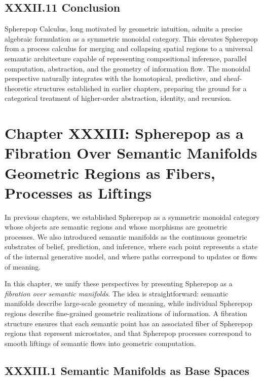\documentclass[12pt,letterpaper]{article}
\begin{document}
\subsection{XXXII.11 Conclusion}

Spherepop Calculus, long motivated by geometric intuition, admits a precise algebraic formulation as a symmetric monoidal category. This elevates Spherepop from a process calculus for merging and collapsing spatial regions to a universal semantic architecture capable of representing compositional inference, parallel computation, abstraction, and the geometry of information flow. The monoidal perspective naturally integrates with the homotopical, predictive, and sheaf-theoretic structures established in earlier chapters, preparing the ground for a categorical treatment of higher-order abstraction, identity, and recursion.

\newpage

\section{Chapter XXXIII: Spherepop as a Fibration Over Semantic Manifolds  
Geometric Regions as Fibers, Processes as Liftings}

In previous chapters, we established Spherepop as a symmetric monoidal category whose objects are semantic regions and whose morphisms are geometric processes. We also introduced semantic manifolds as the continuous geometric substrates of belief, prediction, and inference, where each point represents a state of the internal generative model, and where paths correspond to updates or flows of meaning.

In this chapter, we unify these perspectives by presenting Spherepop as a \emph{fibration over semantic manifolds}. The idea is straightforward: semantic manifolds describe large-scale geometry of meaning, while individual Spherepop regions describe fine-grained geometric realizations of information. A fibration structure ensures that each semantic point has an associated fiber of Spherepop regions that represent microstates, and that Spherepop processes correspond to smooth liftings of semantic flows into geometric computation.

\subsection{XXXIII.1 Semantic Manifolds as Base Spaces}
\end{document}
